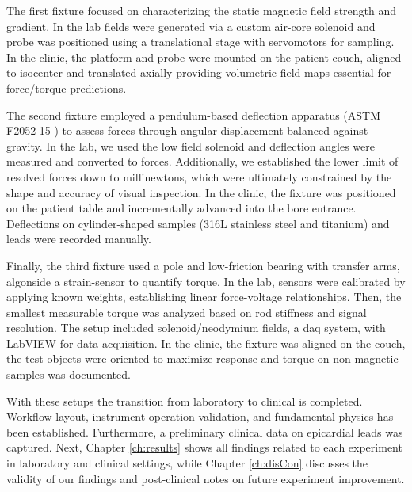 The first fixture focused on characterizing the static magnetic field strength and gradient. In the lab fields were generated via a custom air-core solenoid and probe was positioned using a translational stage with servomotors for sampling. In the clinic, the platform and probe were mounted on the patient couch, aligned to isocenter and translated axially providing volumetric field maps essential for force/torque predictions.

The second fixture employed a pendulum-based deflection apparatus (ASTM F2052-15 \cite{astmF2052}) to assess forces through angular displacement balanced against gravity. In the lab, we used the low field solenoid and deflection angles were measured and converted to forces. Additionally, we established the lower limit of resolved forces down to millinewtons, which were ultimately constrained by the shape and accuracy of visual inspection. In the clinic, the fixture was positioned on the patient table and incrementally advanced into the bore entrance. Deflections on cylinder-shaped samples (316L stainless steel and titanium) and leads were recorded manually.

Finally, the third fixture used a pole and low-friction bearing with transfer arms, algonside a strain-sensor to quantify torque. In the lab, sensors were calibrated by applying known weights, establishing linear force-voltage relationships. Then, the smallest measurable torque was analyzed based on rod stiffness and signal resolution. The setup included solenoid/neodymium fields, a \gls{daq} system, with LabVIEW for data acquisition. In the clinic, the fixture was aligned on the couch, the test objects were oriented to maximize response and torque on non-magnetic samples was documented.

With these setups the transition from laboratory to clinical is completed. Workflow layout, instrument operation validation, and fundamental physics has been established. Furthermore, a preliminary clinical data on epicardial leads was captured. Next, Chapter \ref{ch:results} shows all findings related to each experiment in laboratory and clinical settings, while Chapter \ref{ch:disCon} discusses the validity of our findings and post-clinical notes on future experiment improvement.
